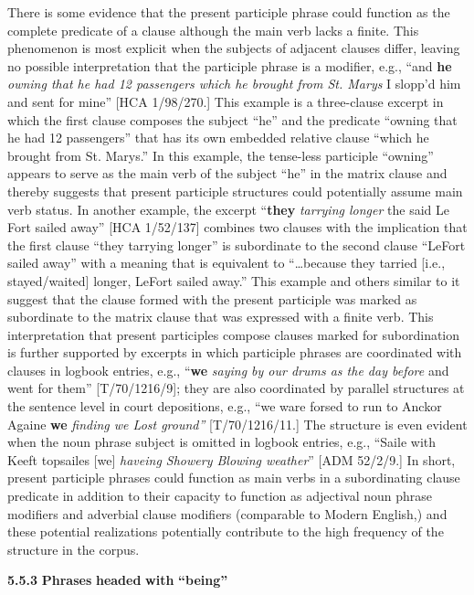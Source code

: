   There is some evidence that the present participle phrase could function as the complete predicate of a clause although the main verb lacks a finite. This phenomenon is most explicit when the subjects of adjacent clauses differ, leaving no possible interpretation that the participle phrase is a modifier, e.g., “and \textbf{he} \textit{owning that he had 12 passengers which he brought from St. Marys} I slopp’d him and sent for mine” [HCA 1/98/270.] This example is a three-clause excerpt in which the first clause composes the subject “he” and the predicate “owning that he had 12 passengers” that has its own embedded relative clause “which he brought from St. Marys.” In this example, the tense-less participle “owning” appears to serve as the main verb of the subject “he” in the matrix clause and thereby suggests that present participle structures could potentially assume main verb status. In another example, the excerpt “\textbf{they} \textit{tarrying longer} the said Le Fort sailed away” [HCA 1/52/137] combines two clauses with the implication that the first clause “they tarrying longer” is subordinate to the second clause “LeFort sailed away” with a meaning that is equivalent to “…because they tarried [i.e., stayed/waited] longer, LeFort sailed away.” This example and others similar to it suggest that the clause formed with the present participle was marked as subordinate to the matrix clause that was expressed with a finite verb. This interpretation that present participles compose clauses marked for subordination is further supported by excerpts in which participle phrases are coordinated with clauses in logbook entries, e.g., “\textbf{we} \textit{saying by our drums as the day before} and went for them” [T/70/1216/9]; they are also coordinated by parallel structures at the sentence level in court depositions, e.g., “we ware forsed to run to Anckor Againe \textbf{we} \textit{finding we Lost ground”} [T/70/1216/11.] The structure is even evident when the noun phrase subject is omitted in logbook entries, e.g., “Saile with Keeft topsailes [we] \textit{haveing Showery Blowing weather}” [ADM 52/2/9.] In short, present participle phrases could function as main verbs in a subordinating clause predicate in addition to their capacity to function as adjectival noun phrase modifiers and adverbial clause modifiers (comparable to Modern English,) and these potential realizations potentially contribute to the high frequency of the structure in the corpus. 

  \textbf{5.5.3} \textbf{Phrases} \textbf{headed} \textbf{with} \textbf{“being”}

